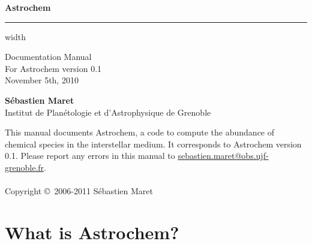 \documentclass[a4paper,12pt]{article}
\makeatletter
\newcommand{\version}{0.1}
\newcommand{\updated}{November 5th, 2010}
\newcommand{\bugreport}{\url{sebastien.maret@obs.ujf-grenoble.fr}}
\makeatother
\begin{document}
\VerbatimFootnotes

\thispagestyle{empty}
\vspace*{5cm}

\noindent
{\huge \textbf{Astrochem}}

\begin{latexonly}
  \vskip4pt \hrule height 4pt width \hsize
\end{latexonly}

\begin{flushright}
  \noindent
  { \small
    Documentation Manual\\
    For Astrochem version \version\\
    \updated
  }
\end{flushright}

\noindent
{\large \textbf{S\'ebastien Maret}}\\
{\small Institut de Plan\'etologie et d'Astrophysique de Grenoble\\}

\newpage
\vspace*{20cm}

{\small
  \noindent This manual documents Astrochem, a code to compute the
  abundance of chemical species in the interstellar medium. It
  corresponds to Astrochem version \version.
  Please report any errors in this manual to \bugreport.
  \\ \\ \noindent Copyright \copyright \, 2006-2011 S\'ebastien
  Maret
}

\section{What is Astrochem?}
\label{sec:what-astrochem}
\end{document}
